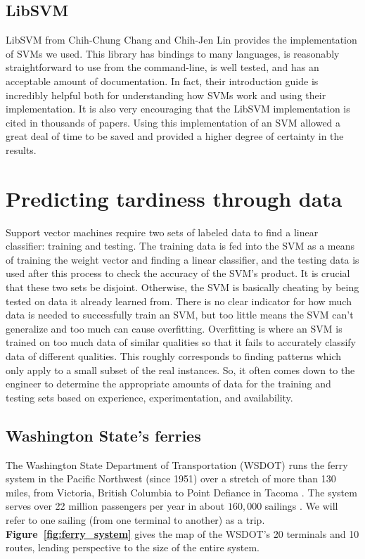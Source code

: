 \documentclass[11pt]{article} %
\begin{document}
\subsection{LibSVM}
\label{sec:libsvm}
LibSVM \cite{chang2011libsvm} from Chih-Chung Chang and Chih-Jen Lin provides the
implementation of SVMs we used.  This library has bindings to many languages, is 
reasonably straightforward to use from the command-line, is well tested, and has an 
acceptable amount of documentation. In fact, their introduction guide 
\cite{chang2011libsvm} is incredibly helpful both for understanding how SVMs work
and using their implementation. It is also very encouraging that the LibSVM 
implementation is cited in thousands of papers.  Using this implementation of an 
SVM allowed a great deal of time to be saved and provided a higher degree of 
certainty in the results.

\section{Predicting tardiness through data}
\label{sec:problem}
Support vector machines require two sets of labeled data to find a linear classifier:
training and testing. The training data is fed into the SVM as a means of training
the weight vector and finding a linear classifier, and the testing data is used
after this process to check the accuracy of the SVM's product. It is crucial that
these two sets be disjoint. Otherwise, the SVM is basically cheating by being
tested on data it already learned from. There is no clear indicator for how much data
is needed to successfully train an SVM, but too little means the SVM can't 
generalize and too much can cause overfitting. Overfitting is where an SVM is
trained on too much data of similar qualities so that it fails to accurately
classify data of different qualities. This roughly corresponds to finding patterns
which only apply to a small subset of the real instances.  So, it often comes
down to the engineer to determine the appropriate amounts of data for the training
and testing sets based on experience, experimentation, and availability.



\subsection{Washington State's ferries}
\label{sec:wsdot}
The Washington State Department of Transportation (WSDOT) runs the ferry system
in the Pacific Northwest (since 1951) over a stretch of more than 130 miles, from 
Victoria, British Columbia to Point Defiance in Tacoma \cite{wsdotFleet}. The system 
serves over 22 million passengers per year in about $160,000$ sailings 
\cite{wsfTraffic}.  We will refer to one sailing (from one terminal to another) as a 
trip.  \textbf{Figure~\ref{fig:ferry_system}} gives the map of the WSDOT's 20 
terminals and 10 routes, lending perspective to the size of the entire system.
\end{document}
